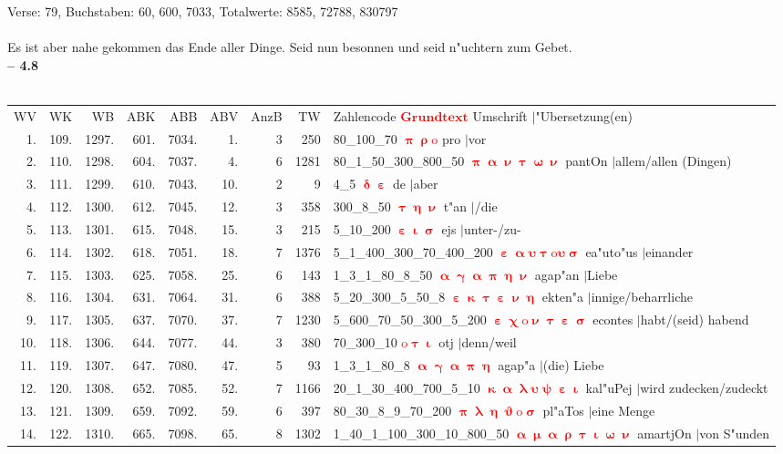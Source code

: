 \documentclass[a4paper,10pt,landscape]{article}
\begin{document}
Verse: 79, Buchstaben: 60, 600, 7033, Totalwerte: 8585, 72788, 830797\\
\\
Es ist aber nahe gekommen das Ende aller Dinge. Seid nun besonnen und seid n"uchtern zum Gebet.\\
\newpage 
{\bf -- 4.8}\\
\medskip \\
\begin{tabular}{rrrrrrrrp{120mm}}
WV&WK&WB&ABK&ABB&ABV&AnzB&TW&Zahlencode \textcolor{red}{$\boldsymbol{Grundtext}$} Umschrift $|$"Ubersetzung(en)\\
1.&109.&1297.&601.&7034.&1.&3&250&80\_100\_70 \textcolor{red}{$\boldsymbol{\uppi\uprho\mathrm{o}}$} pro $|$vor\\
2.&110.&1298.&604.&7037.&4.&6&1281&80\_1\_50\_300\_800\_50 \textcolor{red}{$\boldsymbol{\uppi\upalpha\upnu\uptau\upomega\upnu}$} pantOn $|$allem/allen (Dingen)\\
3.&111.&1299.&610.&7043.&10.&2&9&4\_5 \textcolor{red}{$\boldsymbol{\updelta\upepsilon}$} de $|$aber\\
4.&112.&1300.&612.&7045.&12.&3&358&300\_8\_50 \textcolor{red}{$\boldsymbol{\uptau\upeta\upnu}$} t"an $|$/die\\
5.&113.&1301.&615.&7048.&15.&3&215&5\_10\_200 \textcolor{red}{$\boldsymbol{\upepsilon\upiota\upsigma}$} ejs $|$unter-/zu-\\
6.&114.&1302.&618.&7051.&18.&7&1376&5\_1\_400\_300\_70\_400\_200 \textcolor{red}{$\boldsymbol{\upepsilon\upalpha\upsilon\uptau\mathrm{o}\upsilon\upsigma}$} ea"uto"us $|$einander\\
7.&115.&1303.&625.&7058.&25.&6&143&1\_3\_1\_80\_8\_50 \textcolor{red}{$\boldsymbol{\upalpha\upgamma\upalpha\uppi\upeta\upnu}$} agap"an $|$Liebe\\
8.&116.&1304.&631.&7064.&31.&6&388&5\_20\_300\_5\_50\_8 \textcolor{red}{$\boldsymbol{\upepsilon\upkappa\uptau\upepsilon\upnu\upeta}$} ekten"a $|$innige/beharrliche\\
9.&117.&1305.&637.&7070.&37.&7&1230&5\_600\_70\_50\_300\_5\_200 \textcolor{red}{$\boldsymbol{\upepsilon\upchi\mathrm{o}\upnu\uptau\upepsilon\upsigma}$} econtes $|$habt/(seid) habend\\
10.&118.&1306.&644.&7077.&44.&3&380&70\_300\_10 \textcolor{red}{$\boldsymbol{\mathrm{o}\uptau\upiota}$} otj $|$denn/weil\\
11.&119.&1307.&647.&7080.&47.&5&93&1\_3\_1\_80\_8 \textcolor{red}{$\boldsymbol{\upalpha\upgamma\upalpha\uppi\upeta}$} agap"a $|$(die) Liebe\\
12.&120.&1308.&652.&7085.&52.&7&1166&20\_1\_30\_400\_700\_5\_10 \textcolor{red}{$\boldsymbol{\upkappa\upalpha\uplambda\upsilon\uppsi\upepsilon\upiota}$} kal"uPej $|$wird zudecken/zudeckt\\
13.&121.&1309.&659.&7092.&59.&6&397&80\_30\_8\_9\_70\_200 \textcolor{red}{$\boldsymbol{\uppi\uplambda\upeta\upvartheta\mathrm{o}\upsigma}$} pl"aTos $|$eine Menge\\
14.&122.&1310.&665.&7098.&65.&8&1302&1\_40\_1\_100\_300\_10\_800\_50 \textcolor{red}{$\boldsymbol{\upalpha\upmu\upalpha\uprho\uptau\upiota\upomega\upnu}$} amartjOn $|$von S"unden\\
\end{tabular}\medskip \\
\end{document}
